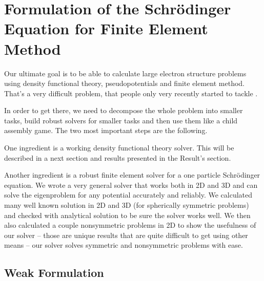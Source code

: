 \section{Formulation of the Schr\"odinger Equation for Finite Element Method}

Our ultimate goal is to be able to calculate large electron structure problems
using density functional theory, pseudopotentials and finite element method.
That's a very difficult problem, that people only very recently started to
tackle \cite{pask1, pask2, ortiz1, ortiz2}.

In order to get there, we need to decompose the whole problem into smaller
tasks, build robust solvers for smaller tasks and then use them like a child
assembly game. The two most important steps are the following.

One ingredient is a working density functional theory solver. This will be
described in a next section and results presented in the Result's section.

Another ingredient is a robust finite element solver for a one particle
Schr\"odinger equation. We wrote a very general solver that works both in 2D
and 3D and can solve the eigenproblem for any potential accurately and
reliably. We calculated many well known solution in 2D and 3D (for spherically
symmetric problems) and checked with analytical solution to be sure the solver
works well. We then also calculated a couple nonsymmetric problems in 2D to
show the usefulness of our solver -- those are unique results that are quite
difficult to get using other means -- our solver solves symmetric and
nonsymmetric problems with ease.

\subsection{Weak Formulation}

